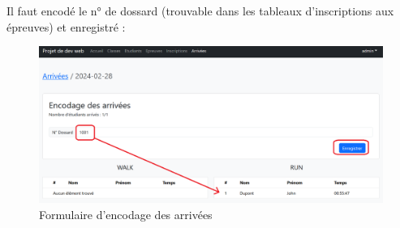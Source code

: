 Il faut encodé le n° de dossard (trouvable dans les tableaux d'inscriptions aux épreuves) et enregistré :

\begin{figure}[H]
	\centering
	\includegraphics[keepaspectratio,width=12cm]{images/Emploi11}
	\caption{Formulaire d'encodage des arrivées}
\end{figure}